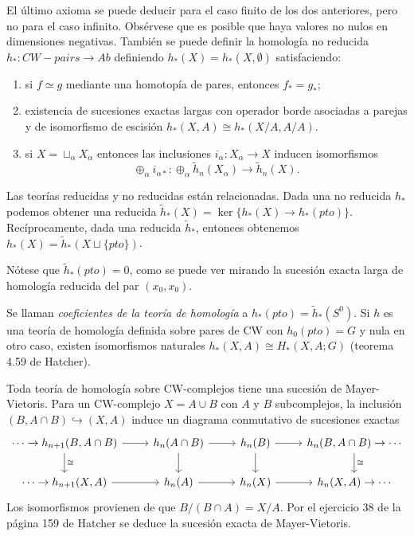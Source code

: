 \documentclass[TA.tex]{subfiles}
\begin{document}
El último axioma se puede deducir para el caso finito de los dos anteriores, pero no para el caso infinito. Obsérvese que es posible que haya valores no nulos en dimensiones negativas. También se puede definir la homología no reducida $h_*:CW-pairs\to Ab$ definiendo $h_*(X)=h_*(X,\emptyset)$ satisfaciendo:
\begin{enumerate}
\item si $f\simeq g$ mediante una homotopía de pares, entonces $f_*=g_*$;
\item existencia de sucesiones exactas largas con operador borde asociadas a parejas y de isomorfismo de escisión $h_*(X,A)\cong h_*(X/A,A/A)$. 
\item si $X=\sqcup_\alpha X_\alpha$ entonces las inclusiones $i_\alpha:X_\alpha\to X$ inducen isomorfismos $$\oplus_\alpha i_{\alpha*}:\oplus_\alpha\tilde{h}_n(X_\alpha)\to \tilde{h}_n(X).$$
\end{enumerate}

Las teorías reducidas y no reducidas están relacionadas. Dada una no reducida $h_*$ podemos obtener una reducida $\tilde{h}_*(X)=\ker\{h_*(X)\to h_*(pto)\}$. Recíprocamente, dada una reducida $\tilde{h}_*$, entonces obtenemos $h_*(X)=\tilde{h}_*(X\sqcup\{pto\})$.

Nótese que $\tilde{h}_*(pto)=0$, como se puede ver mirando la sucesión exacta larga de homología reducida del par $(x_0,x_0)$. 

Se llaman \emph{coeficientes de la teoría de homología} a $h_*(pto)=\tilde{h}_*(S^0)$. Si $h$ es una teoría de homología definida sobre pares de CW con $h_0(pto)=G$ y nula en otro caso, existen isomorfismos naturales $h_*(X,A)\cong H_*(X,A;G)$ (teorema 4.59 de Hatcher). 

Toda teoría de homología sobre CW-complejos tiene una sucesión de Mayer-Vietoris. Para un CW-complejo $X=A\cup B$ con $A$ y $B$ subcomplejos, la inclusión $(B,A\cap B)\hookrightarrow (X,A)$ induce un diagrama conmutativo de sucesiones exactas 
\[
\begin{tikzcd}
\cdots\to h_{n+1}(B,A\cap B)\arrow[r]\arrow[d, "\cong"] & h_n(A\cap B)\arrow[d]\arrow[r] & h_n(B)\arrow[r]\arrow[d] & h_{n}(B,A\cap B)\arrow[d, "\cong"]\to\cdots\\
\cdots\to h_{n+1}(X,A)\arrow[r] & h_n(A)\arrow[r] & h_n(X)\arrow[r] & h_n(X,A)\to\cdots
\end{tikzcd}
\]
Los isomorfismos provienen de que $B/(B\cap A)=X/A$. Por el ejercicio 38 de la página 159 de Hatcher se deduce la sucesión exacta de Mayer-Vietoris.
\end{document}
